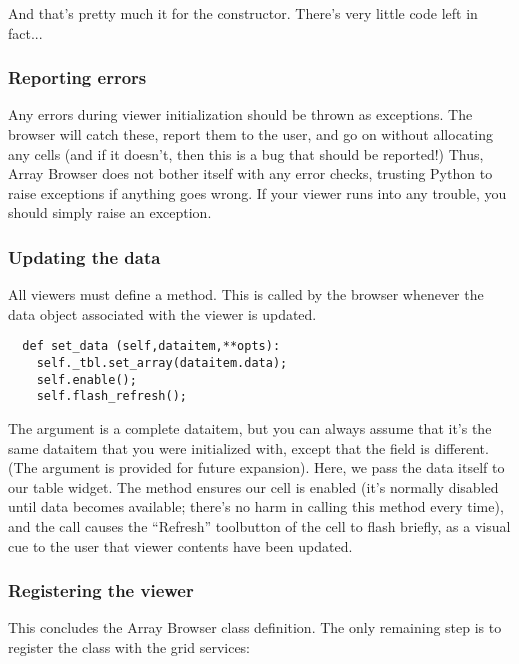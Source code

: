 \documentclass[12pt,twoside]{book}
\begin{document}
  And that's pretty much it for the constructor. There's very little code left
  in fact...

\subsubsection{Reporting errors} 

  Any errors during viewer initialization should be thrown as exceptions. The
  browser will catch these, report them to the user,  and go on without
  allocating any cells (and if it doesn't, then this is a bug that should be
  reported!) Thus, Array Browser does not bother itself with any error checks,
  trusting Python to raise exceptions if anything goes wrong.  If your viewer
  runs into any trouble, you should simply raise an exception.

\subsubsection{Updating the data} 

  All viewers must define a  method. This is called by the
  browser whenever the data object associated with the viewer is updated.

\begin{verbatim}  
  def set_data (self,dataitem,**opts):
    self._tbl.set_array(dataitem.data);
    self.enable();
    self.flash_refresh();
\end{verbatim}
  
  The  argument is a complete dataitem, but you can always  assume
  that it's the same dataitem that you were initialized with, except that the
   field is different. (The  argument is provided
  for future expansion). Here, we pass the data itself to our table widget. The
   method ensures our cell is enabled (it's normally disabled until
  data becomes available; there's no harm in calling this method every time),
  and the  call causes the ``Refresh'' toolbutton of the
  cell to flash briefly, as a visual cue to the user that viewer contents have
  been updated.

\subsubsection{Registering the viewer} 

  This concludes the Array Browser class definition. The only remaining step is
  to register the class with the grid services:
\end{document}

